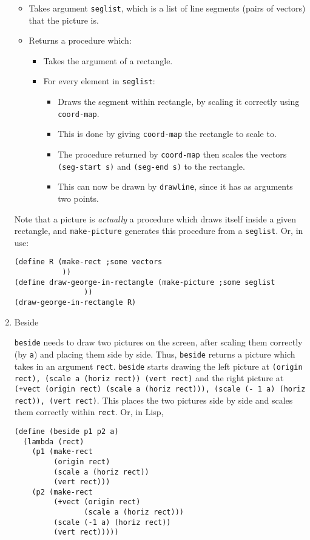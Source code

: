 \documentclass[9pt]{report}
\begin{document}
\begin{enumerate}
\begin{itemize}
\item Takes argument \texttt{seglist}, which is a list of line segments
(pairs of vectors) that the picture is.
\item Returns a procedure which:
\begin{itemize}
\item Takes the argument of a rectangle.
\item For every element in \texttt{seglist}:
\begin{itemize}
\item Draws the segment within rectangle, by scaling it correctly
using \texttt{coord-map}.
\item This is done by giving \texttt{coord-map} the rectangle to scale
to.
\item The procedure returned by \texttt{coord-map} then scales the
vectors \texttt{(seg-start s)} and \texttt{(seg-end s)} to the rectangle.
\item This can now be drawn by \texttt{drawline}, since it has as
arguments two points.
\end{itemize}
\end{itemize}
\end{itemize}

Note that a picture is \emph{actually} a procedure which draws itself
inside a given rectangle, and \texttt{make-picture} generates this
procedure from a \texttt{seglist}. Or, in use:

\begin{verbatim}
(define R (make-rect ;some vectors
           ))
(define draw-george-in-rectangle (make-picture ;some seglist
                ))
(draw-george-in-rectangle R)
\end{verbatim}

\item Beside
\label{sec:org9e4b301}

\texttt{beside} needs to draw two pictures on the screen, after scaling
them correctly (by \texttt{a}) and placing them side by side. Thus,
\texttt{beside} returns a picture which takes in an argument \texttt{rect}.
\texttt{beside} starts drawing the left picture at \texttt{(origin rect),
     (scale a (horiz rect)) (vert rect)} and the right picture at
\texttt{(+vect (origin rect) (scale a (horiz rect))), (scale (- 1 a)
     (horiz rect)), (vert rect)}. This places the two pictures side by
side and scales them correctly within \texttt{rect}. Or, in Lisp,

\begin{verbatim}
(define (beside p1 p2 a)
  (lambda (rect)
    (p1 (make-rect
         (origin rect)
         (scale a (horiz rect))
         (vert rect)))
    (p2 (make-rect
         (+vect (origin rect)
                (scale a (horiz rect)))
         (scale (-1 a) (horiz rect))
         (vert rect)))))
\end{verbatim}


\end{enumerate}
\end{document}
